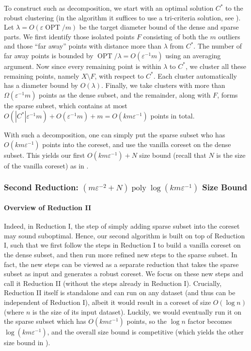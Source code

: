 \documentclass[letterpaper,11pt]{article}
\theoremstyle{plain}
\theoremstyle{definition}
\theoremstyle{remark}
\DeclareMathOperator{\poly}{poly}
\DeclareMathOperator{\OPT}{OPT}
\newcommand{\eps}{\varepsilon}
\renewcommand{\epsilon}{\varepsilon}
\begin{document}
To construct such as decomposition,
we start with an optimal solution $C^*$ to the robust clustering
(in the algorithm it suffices to use a tri-criteria solution, see ).
Let $\lambda = O(\epsilon \OPT / m)$ be the target diameter bound of the dense and sparse parts.
We first identify those isolated points $F$ consisting of both the $m$ outliers and those ``far away'' points with distance more than $\lambda$ from $C^*$.
The number of far away points is bounded by $\OPT/\lambda = O(\eps^{-1} m)$ using an averaging argument.
Now since every remaining point is within $\lambda$ to $C^*$,
we cluster all these remaining points, namely $X \setminus F$,
with respect to $C^*$.
Each cluster automatically has a diameter bound by $O(\lambda)$.
Finally, we take clusters with more than $\Omega(\epsilon^{-1} m)$ points as the dense subset, and the remainder, along with $F$, forms the sparse subset, which contains at most $O(|C^*| \epsilon^{-1}m) + O(\eps^{-1}m) + m = O(km\eps^{-1})$ points in total.


With such a decomposition, one can simply put the sparse subset who has $O(km\eps^{-1})$ points into the coreset,
and use the vanilla coreset on the dense subset. This yields our first $O(km\eps^{-1}) + N$ size bound (recall that $N$ is the size of the vanilla coreset) as in .


\subsubsection{Second Reduction: $(m\eps^{-2} + N)\poly\log(km\eps^{-1})$ Size Bound}
\label{sec:second_overview}


\paragraph{Overview of Reduction II}
Indeed, in Reduction I, the step of simply adding sparse subset into the coreset may sound suboptimal.
Hence, our second algorithm is built on top of Reduction I, such that we first follow the steps in Reduction I to build a vanilla coreset on the dense subset,
and then run more refined new steps to the sparse subset.
In fact, the new steps can be viewed as a separate reduction that takes the sparse subset as input and generates a robust coreset.
We focus on these new steps and call it Reduction II (without the steps already in Reduction I). 
Crucially, Reduction II itself is standalone and can run on any dataset (and thus can be independent of Reduction I), 
albeit it would result in a coreset of size $O(\log n)$ (where $n$ is the size of its input dataset).
Luckily, we would eventually run it on the sparse subset which has $O(km\eps^{-1})$ points,
so the $\log n$ factor becomes $\log(km\epsilon^{-1})$,
and the overall size bound is competitive (which yields the other size bound in ).
\end{document}
